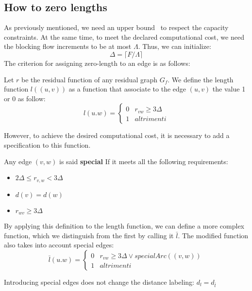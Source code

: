 \subsection{How to zero lengths}
As previously mentioned, we need an upper bound \dlt\  to respect the capacity constraints. At the same time, to meet the declared computational cost, we need the blocking flow increments to be at most $\Lambda$.
Thus, we can initialize:
\[\Delta= \lceil F/\Lambda \rceil \]
The criterion for assigning zero-length to an edge is as follows:
\begin{definition}
Let $r$ be the residual function of any residual graph $G_f$. We define the length function $l((u,v))$ as a function that associate to the edge $(u,v)$ the value 1 or 0 as follow:
        \[l(u.w) = \left \{ \begin{array}{ll}
        0 & r_{vw} \ge 3\Delta\\
        1 & altrimenti
    \end{array} \right .\]
\end{definition}

However, to achieve the desired computational cost, it is necessary to add a specification to this function.
\begin{definition}

Any edge $(v,w)$ is said \textbf{special} If it meets all the following requirements:
    \begin{itemize}
        \item $2\Delta \le r_{v,w} < 3\Delta$
        \item $d(v) = d(w)$
        \item $r_{wv} \ge 3\Delta$
    \end{itemize}
\end{definition}  


By applying this definition to the length function, we can define a more complex function, which we distinguish from the first by calling it $\bar{l} $.
The modified function also takes into account special edges:
\[\bar{l}(u.w) = \left \{ \begin{array}{ll}
    0 & r_{vw} \ge 3\Delta \lor specialArc((v,w))\\
    1 & altrimenti
\end{array} \right .\]
\begin{obs}
Introducing special edges does not change the distance labeling: $d_l = d_{\bar{l}}$
\end{obs}


